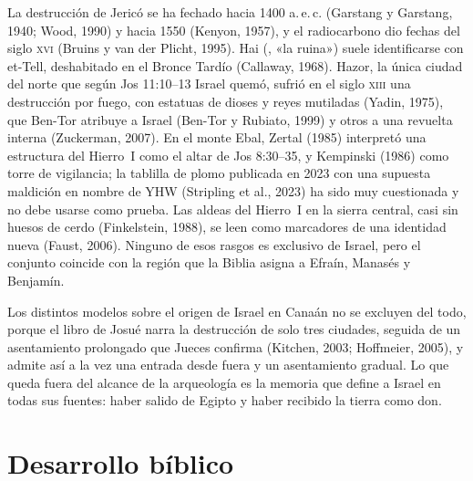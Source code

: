 La destrucción de Jericó se ha fechado hacia 1400 a.\,e.\,c. (Garstang y Garstang, 1940; Wood, 1990) y hacia 1550 (Kenyon, 1957), y el radiocarbono dio fechas del siglo \textsc{xvi} (Bruins y van der Plicht, 1995). Hai (, «la ruina») suele identificarse con et-Tell, deshabitado en el Bronce Tardío (Callaway, 1968). Hazor, la única ciudad del norte que según Jos 11:10–13 Israel quemó, sufrió en el siglo \textsc{xiii} una destrucción por fuego, con estatuas de dioses y reyes mutiladas (Yadin, 1975), que Ben-Tor atribuye a Israel (Ben-Tor y Rubiato, 1999) y otros a una revuelta interna (Zuckerman, 2007). En el monte Ebal, Zertal (1985) interpretó una estructura del Hierro~I como el altar de Jos 8:30–35, y Kempinski (1986) como torre de vigilancia; la tablilla de plomo publicada en 2023 con una supuesta maldición en nombre de YHW (Stripling et al., 2023) ha sido muy cuestionada y no debe usarse como prueba. Las aldeas del Hierro~I en la sierra central, casi sin huesos de cerdo (Finkelstein, 1988), se leen como marcadores de una identidad nueva (Faust, 2006). Ninguno de esos rasgos es exclusivo de Israel, pero el conjunto coincide con la región que la Biblia asigna a Efraín, Manasés y Benjamín.

Los distintos modelos sobre el origen de Israel en Canaán no se excluyen del todo, porque el libro de Josué narra la destrucción de solo tres ciudades, seguida de un asentamiento prolongado que Jueces confirma (Kitchen, 2003; Hoffmeier, 2005), y admite así a la vez una entrada desde fuera y un asentamiento gradual. Lo que queda fuera del alcance de la arqueología es la memoria que define a Israel en todas sus fuentes: haber salido de Egipto y haber recibido la tierra como don.

\section{Desarrollo bíblico}

